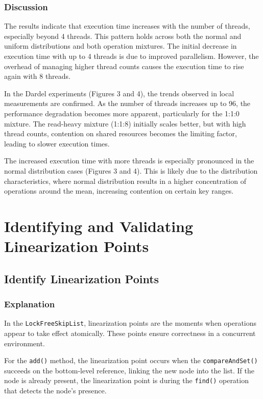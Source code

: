 \documentclass{article}
\begin{document}
\subsubsection{Discussion}
The results indicate that execution time increases with the number of threads, especially beyond 4 threads. This pattern holds across both the normal and uniform distributions and both operation mixtures. The initial decrease in execution time with up to 4 threads is due to improved parallelism. However, the overhead of managing higher thread counts causes the execution time to rise again with 8 threads.

In the Dardel experiments (Figures 3 and 4), the trends observed in local measurements are confirmed. As the number of threads increases up to 96, the performance degradation becomes more apparent, particularly for the 1:1:0 mixture. The read-heavy mixture (1:1:8) initially scales better, but with high thread counts, contention on shared resources becomes the limiting factor, leading to slower execution times.

The increased execution time with more threads is especially pronounced in the normal distribution cases (Figures 3 and 4). This is likely due to the distribution characteristics, where normal distribution results in a higher concentration of operations around the mean, increasing contention on certain key ranges.


\newpage
\section{Identifying and Validating Linearization Points}

\subsection{Identify Linearization Points}

\subsubsection{Explanation}
In the \texttt{LockFreeSkipList}, linearization points are the moments when operations appear to take effect atomically. These points ensure correctness in a concurrent environment.

For the \texttt{add()} method, the linearization point occurs when the \texttt{compareAndSet()} succeeds on the bottom-level reference, linking the new node into the list. If the node is already present, the linearization point is during the \texttt{find()} operation that detects the node’s presence.
\end{document}
